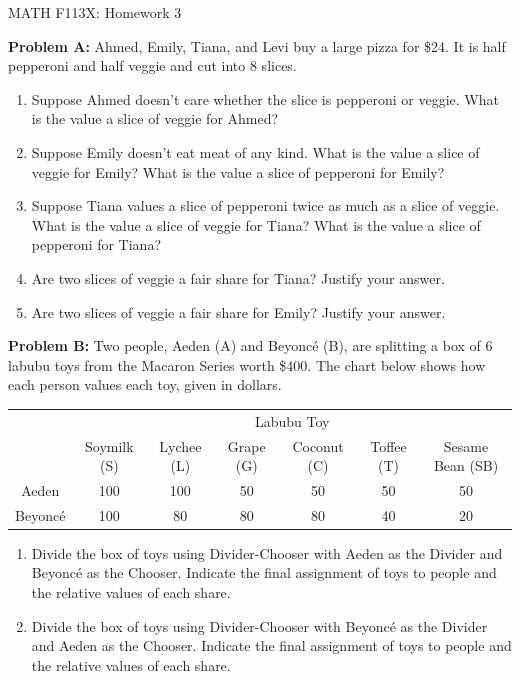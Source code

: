 \documentclass[11pt, oneside]{article}
\begin{document}
\begin{center} {\Large{MATH F113X: Homework 3}} \end{center}
\vspace{.3in}

\vfill

{\bf Problem A:}
Ahmed, Emily, Tiana, and Levi buy a large pizza for \$24. It is half pepperoni and half veggie and cut into 8 slices.
\begin{enumerate}
	\item[a.] Suppose Ahmed doesn't care whether the slice is pepperoni or veggie. What is the value a slice of veggie for Ahmed?
	\item[b.] Suppose Emily doesn't eat meat of any kind. What is the value a slice of veggie for Emily? What is the value a slice of pepperoni for Emily?
	\item[c.] Suppose Tiana values a slice of pepperoni twice as much as a slice of veggie. What is the value a slice of veggie for Tiana? What is the value a slice of pepperoni for Tiana?
	\item[d.] Are two slices of veggie a fair share for Tiana? Justify your answer.
	\item[e.] Are two slices of veggie a fair share for Emily? Justify your answer.
\end{enumerate}
\vfill

\textbf{Problem B:} Two people, Aeden (A) and Beyonc\'{e} (B), are splitting a box of 6 labubu toys from the Macaron Series worth \$400. The chart below shows how each person values each toy, given in dollars.

\begin{tabular}{| c || c | c | c | c | c | c |}
\hline
& \multicolumn{6}{c}{Labubu Toy}\\
& Soymilk (S)&Lychee (L)&Grape (G) &Coconut (C) &Toffee (T) & Sesame Bean (SB) \\
\hline
Aeden &100&100&50&50&50&50\\
Beyonc\'{e}&100&80&80&80&40&20\\
\hline
\end{tabular}
	\begin{enumerate}
	\item Divide the box of toys using Divider-Chooser with Aeden as the Divider and Beyonc\'{e} as the Chooser. Indicate the final assignment of toys to people and the relative values of each share.
	\item Divide the box of toys using Divider-Chooser with Beyonc\'{e}  as the Divider and Aeden as the Chooser. Indicate the final assignment of toys to people and the relative values of each share.

	\end{enumerate}
\end{document}
